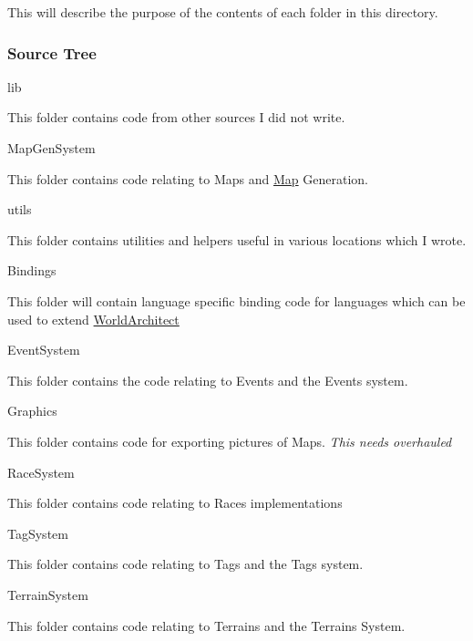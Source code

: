 This will describe the purpose of the contents of each folder in this directory.

\subsubsection*{Source Tree}


\begin{DoxyItemize}
\item lib
\begin{DoxyItemize}
\item This folder contains code from other sources I did not write.
\end{DoxyItemize}
\item Map\+Gen\+System
\begin{DoxyItemize}
\item This folder contains code relating to Maps and \mbox{\hyperlink{class_map}{Map}} Generation.
\end{DoxyItemize}
\item utils
\begin{DoxyItemize}
\item This folder contains utilities and helpers useful in various locations which I wrote.
\end{DoxyItemize}
\item Bindings
\begin{DoxyItemize}
\item This folder will contain language specific binding code for languages which can be used to extend \mbox{\hyperlink{namespace_world_architect}{World\+Architect}}
\end{DoxyItemize}
\item Event\+System
\begin{DoxyItemize}
\item This folder contains the code relating to Events and the Events system.
\end{DoxyItemize}
\item Graphics
\begin{DoxyItemize}
\item This folder contains code for exporting pictures of Maps. {\itshape This needs overhauled}
\end{DoxyItemize}
\item Race\+System
\begin{DoxyItemize}
\item This folder contains code relating to Races implementations
\end{DoxyItemize}
\item Tag\+System
\begin{DoxyItemize}
\item This folder contains code relating to Tags and the Tags system.
\end{DoxyItemize}
\item Terrain\+System
\begin{DoxyItemize}
\item This folder contains code relating to Terrains and the Terrains System. 
\end{DoxyItemize}
\end{DoxyItemize}